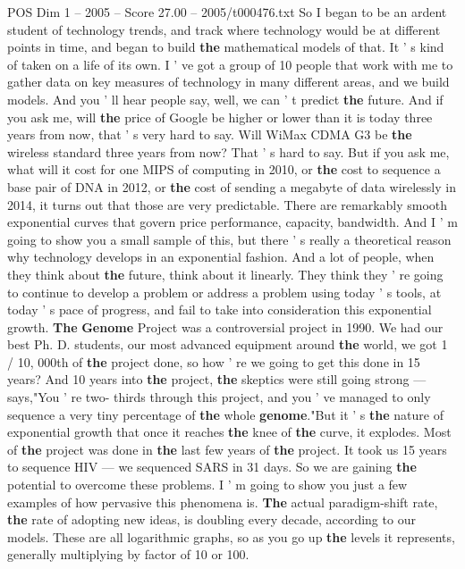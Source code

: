 \begin{textsample}{POS Dim 1 – 2005 – Score 27.00 – 2005/t000476.txt}
So I began to be an ardent student of technology trends, and track where technology would be at different points in time, and began to build \textbf{the} mathematical models of that.
It ' s kind of taken on a life of its own.
I ' ve got a group of 10 people that work with me to gather data on key measures of technology in many different areas, and we build models.
And you ' ll hear people say, well, we can ' t predict \textbf{the} future.
And if you ask me, will \textbf{the} price of Google be higher or lower than it is today three years from now, that ' s very hard to say.
Will WiMax CDMA G3 be \textbf{the} wireless standard three years from now?
That ' s hard to say.
But if you ask me, what will it cost for one MIPS of computing in 2010, or \textbf{the} cost to sequence a base pair of DNA in 2012, or \textbf{the} cost of sending a megabyte of data wirelessly in 2014, it turns out that those are very predictable.
There are remarkably smooth exponential curves that govern price performance, capacity, bandwidth.
And I ' m going to show you a small sample of this, but there ' s really a theoretical reason why technology develops in an exponential fashion.
And a lot of people, when they think about \textbf{the} future, think about it linearly.
They think they ' re going to continue to develop a problem or address a problem using today ' s tools, at today ' s pace of progress, and fail to take into consideration this exponential growth. \textbf{The} \textbf{Genome} Project was a controversial project in 1990.
We had our best Ph.
D. students, our most advanced equipment around \textbf{the} world, we got 1 / 10, 000th of \textbf{the} project done, so how ' re we going to get this done in 15 years?
And 10 years into \textbf{the} project, \textbf{the} skeptics were still going strong — says,"You ' re two- thirds through this project, and you ' ve managed to only sequence a very tiny percentage of \textbf{the} whole \textbf{genome}."But it ' s \textbf{the} nature of exponential growth that once it reaches \textbf{the} knee of \textbf{the} curve, it explodes.
Most of \textbf{the} project was done in \textbf{the} last few years of \textbf{the} project.
It took us 15 years to sequence HIV — we sequenced SARS in 31 days.
So we are gaining \textbf{the} potential to overcome these problems.
I ' m going to show you just a few examples of how pervasive this phenomena is. \textbf{The} actual paradigm-shift rate, \textbf{the} rate of adopting new ideas, is doubling every decade, according to our models.
These are all logarithmic graphs, so as you go up \textbf{the} levels it represents, generally multiplying by factor of 10 or 100.

\end{textsample}
